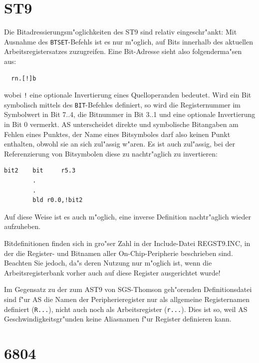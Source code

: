 \documentclass[12pt,a4paper,twoside]{report}
\newcommand{\tty}[1]{{\tt #1}}
\newcommand{\asname}{AS}
\begin{document}

\section{ST9}

Die Bitadressierungsm"oglichkeiten des ST9 sind relativ eingeschr"ankt:
Mit Ausnahme des \tty{BTSET}-Befehls ist es nur m"oglich, auf Bits innerhalb
des aktuellen Arbeitsregistersatzes zuzugreifen.  Eine Bit-Adresse
sieht also folgenderma"sen aus:
\begin{verbatim}
  rn.[!]b
\end{verbatim}
wobei \verb?!? eine optionale Invertierung eines Quelloperanden bedeutet.
Wird ein Bit symbolisch mittels des \tty{BIT}-Befehles definiert, so wird
die Registernummer im Symbolwert in Bit 7..4, die Bitnummer in Bit
3..1 und eine optionale Invertierung in Bit 0 vermerkt.  \asname{} unterscheidet
direkte und symbolische Bitangaben am Fehlen eines Punktes,
der Name eines Bitsymboles darf also keinen Punkt enthalten, obwohl
sie an sich zul"assig w"aren.  Es ist auch zul"assig, bei der Referenzierung
von Bitsymbolen diese zu nachtr"aglich zu invertieren:
\begin{verbatim}
bit2    bit     r5.3
        .
        .
        bld	r0.0,!bit2
\end{verbatim}
Auf diese Weise ist es auch m"oglich, eine inverse Definition nachtr"aglich
wieder aufzuheben.
\par
Bitdefinitionen finden sich in gro"ser Zahl in der Include-Datei
REGST9.INC, in der die Register- und Bitnamen aller On-Chip-Peripherie
beschrieben sind.  Beachten Sie jedoch, da"s deren Nutzung
nur m"oglich ist, wenn die Arbeitsregisterbank vorher auch auf diese
Register ausgerichtet wurde!
\par
Im Gegensatz zu der zum AST9 von SGS-Thomson geh"orenden Definitionsdatei
sind f"ur \asname{} die Namen der Peripherieregister nur als allgemeine
Registernamen definiert (\tty{R...}), nicht auch noch als Arbeitsregister
(\tty{r...}).  Dies ist so, weil \asname{} Geschwindigkeitsgr"unden keine
Aliasnamen f"ur Register definieren kann.


\section{6804}
\end{document}
